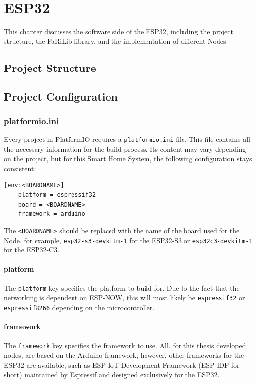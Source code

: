 \chapter{ESP32} 
This chapter discusses the software side of the ESP32,
including the project structure, the FaRiLib library, and the
implementation of different Nodes

\section{Project Structure}

\section{Project Configuration}

    \subsection{platformio.ini}
    Every project in PlatformIO requires a \texttt{platformio.ini} file. This file
    contains all the necessary information for the build process. Its content may
    vary depending on the project, but for this Smart Home System, the following
    configuration stays consistent:
    \begin{lstlisting}[style=cppCode]
    [env:<BOARDNAME>]
    platform = espressif32
    board = <BOARDNAME>
    framework = arduino
    \end{lstlisting}
    The \texttt{<BOARDNAME>} should be replaced with the name of the board used
    for the Node, for example, \texttt{esp32-s3-devkitm-1} for the ESP32-S3 or
    \texttt{esp32c3-devkitm-1} for the ESP32-C3.

        \subsubsection{platform}
        The \texttt{platform} key specifies the platform to build for. Due to the
        fact that the networking is dependent on ESP-NOW, this will most likely be
        \texttt{espressif32} or \texttt{espressif8266} depending on the 
        microcontroller.
        
        \subsubsection{framework}
        The \texttt{framework} key specifies the framework to use. All, for this 
        thesis developed nodes, are based on the Arduino framework, however, other
        frameworks for the ESP32 are available, such as ESP-IoT-Development-Framework
        (ESP-IDF for short) maintained by Espressif and designed exclusively for the 
        ESP32.
        
